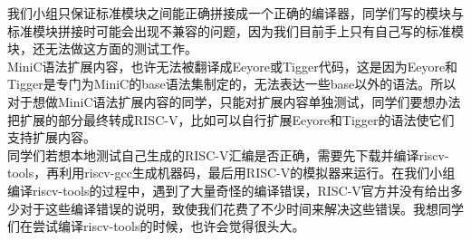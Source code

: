 \documentclass[a4paper]{ctexart}
\begin{document}
我们小组只保证标准模块之间能正确拼接成一个正确的编译器，同学们写的模块与标准模块拼接时可能会出现不兼容的问题，因为我们目前手上只有自己写的标准模块，还无法做这方面的测试工作。
\\

MiniC语法扩展内容，也许无法被翻译成Eeyore或Tigger代码，这是因为Eeyore和Tigger是专门为MiniC的base语法集制定的，无法表达一些base以外的语法。所以对于想做MiniC语法扩展内容的同学，只能对扩展内容单独测试，同学们要想办法把扩展的部分最终转成RISC-V，比如可以自行扩展Eeyore和Tigger的语法使它们支持扩展内容。
\\

同学们若想本地测试自己生成的RISC-V汇编是否正确，需要先下载并编译riscv-tools，再利用riscv-gcc生成机器码，最后用RISC-V的模拟器来运行。在我们小组编译riscv-tools的过程中，遇到了大量奇怪的编译错误，RISC-V官方并没有给出多少对于这些编译错误的说明，致使我们花费了不少时间来解决这些错误。我想同学们在尝试编译riscv-tools的时候，也许会觉得很头大。
\end{document}
